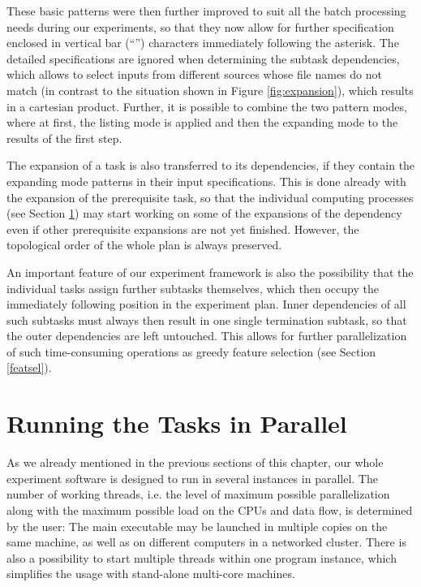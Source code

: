 \documentclass[12pt,notitlepage]{report}
\begin{document}
These basic patterns were then further improved to suit all the batch processing needs during our experiments, so that they now allow for further specification enclosed in vertical bar (``\textbar'') characters immediately following the asterisk. The detailed specifications are ignored when determining the subtask dependencies, which allows to select inputs from different sources whose file names do not match (in contrast to the situation shown in Figure \ref{fig:expansion}), which results in a cartesian product. Further, it is possible to combine the two pattern modes, where at first, the listing mode is applied and then the expanding mode to the results of the first step.

The expansion of a task is also transferred to its dependencies, if they contain the expanding mode patterns in their input specifications. This is done already with the expansion of the prerequisite task, so that the individual computing processes (see Section \ref{parallel}) may start working on some of the expansions of the dependency even if other prerequisite expansions are not yet finished. However, the topological order of the whole plan is always preserved. 
 
An important feature of our experiment framework is also the possibility that the individual tasks assign further subtasks themselves, which then occupy the immediately following position in the experiment plan. Inner dependencies of all such subtasks must always then result in one single termination subtask, so that the outer dependencies are left untouched. This allows for further parallelization of such time-consuming operations as greedy feature selection (see Section \ref{featsel}).

\section{Running the Tasks in Parallel}\label{parallel}

As we already mentioned in the previous sections of this chapter, our whole experiment software is designed to run in several instances in parallel. The number of working threads, i.e. the level of maximum possible parallelization along with the maximum possible load on the CPUs and data flow, is determined by the user: The main executable may be launched in multiple copies on the same machine, as well as on different computers in a networked cluster. There is also a possibility to start multiple threads within one program instance, which simplifies the usage with stand-alone multi-core machines.
\end{document}
